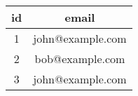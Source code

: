 \begin{tabular}{|c|c|}
    \hline
        \textbf{id} & \textbf{email} \\ \hline
        1 & john@example.com \\ 
        2 & bob@example.com \\ 
        3 & john@example.com \\ \hline
\end{tabular}